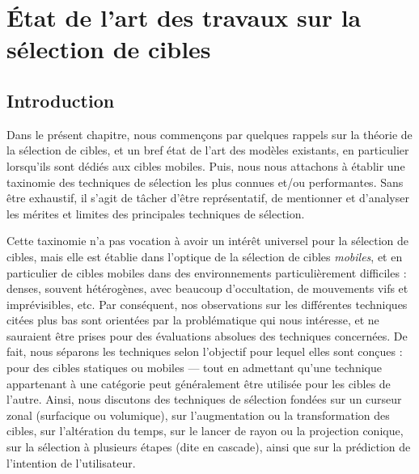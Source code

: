 
\chapter[Sélection de cibles : état de l'art]{État de l'art des travaux sur la sélection de cibles}
\minitoc
\label{chap2}
\clearpage

\section{Introduction}
	Dans le présent chapitre, nous commençons par quelques rappels sur la théorie de la sélection de cibles, et un bref état de l'art des modèles existants, en particulier lorsqu'ils sont dédiés aux cibles mobiles. Puis, nous nous attachons à établir une taxinomie des techniques de sélection les plus connues et/ou performantes. Sans être exhaustif, il s'agit de tâcher d'être représentatif, de mentionner et d'analyser les mérites et limites des principales techniques de sélection.
	
	Cette taxinomie n'a pas vocation à avoir un intérêt universel pour la sélection de cibles, mais elle est établie dans l'optique de la sélection de cibles \emph{mobiles}, et en particulier de cibles mobiles dans des environnements particulièrement difficiles : denses, souvent hétérogènes, avec beaucoup d'occultation, de mouvements vifs et imprévisibles, etc. Par conséquent, nos observations sur les différentes techniques citées plus bas sont orientées par la problématique qui nous intéresse, et ne sauraient être prises pour des évaluations absolues des techniques concernées. De fait, nous séparons les techniques selon l'objectif pour lequel elles sont conçues : pour des cibles statiques ou mobiles --- tout en admettant qu'une technique appartenant à une catégorie peut généralement être utilisée pour les cibles de l'autre. Ainsi, nous discutons des techniques de sélection fondées sur un curseur zonal (surfacique ou volumique), sur l'augmentation ou la transformation des cibles, sur l'altération du temps, sur le lancer de rayon ou la projection conique, sur la sélection à plusieurs étapes (dite en cascade), ainsi que sur la prédiction de l'intention de l'utilisateur.
	
